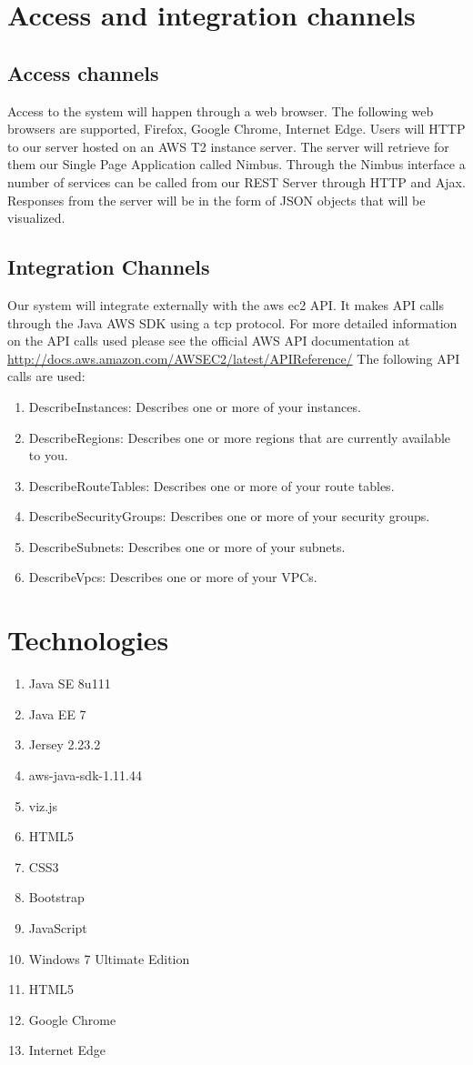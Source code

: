 \documentclass[hidelinks,a4paper,12pt]{article}
\begin{document}
\section{Access and integration channels}

\subsection{Access channels}
Access to the system will happen through a web browser. The following web browsers are supported, Firefox, Google Chrome, Internet Edge. Users will HTTP to our server hosted on an AWS T2 instance server. The server will retrieve for them our Single Page Application called Nimbus. Through the Nimbus interface a number of services can be called from our REST Server through HTTP and Ajax. Responses from the server will be in the form of JSON objects that will be visualized. 


\subsection{Integration Channels}
Our system will integrate externally with the aws ec2 API. It makes API calls through the Java AWS SDK using a tcp protocol. For more detailed information on the API calls used please see the official AWS API documentation at \url{http://docs.aws.amazon.com/AWSEC2/latest/APIReference/}
The following API calls are used:

\begin{enumerate} 
\item DescribeInstances: Describes one or more of your instances.
\item DescribeRegions: Describes one or more regions that are currently available to you.
\item DescribeRouteTables: Describes one or more of your route tables.
\item DescribeSecurityGroups: Describes one or more of your security groups.
\item DescribeSubnets: Describes one or more of your subnets.
\item DescribeVpcs: Describes one or more of your VPCs.
\end{enumerate}


\section{Technologies} 
\begin{enumerate} 
\item Java SE 8u111
\item Java EE 7
\item Jersey 2.23.2 
\item aws-java-sdk-1.11.44
\item viz.js
\item HTML5
\item CSS3
\item Bootstrap
\item JavaScript
\item Windows 7 Ultimate Edition
\item HTML5
\item Google Chrome
\item Internet Edge
\end{enumerate}
\end{document}
